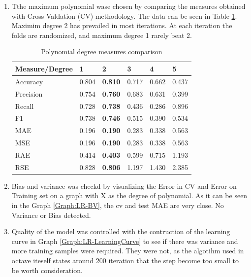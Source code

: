 \documentclass{article}
\begin{document}
\begin{enumerate}  
\item Tthe maximum polynomial wase chosen by comparing the measures obtained with Cross Valdation (CV) methodology. The data can be seen in Table
\ref{tab:LR-Measures}. Maximim degree 2 has prevailed in most iterations. At each iteration the folds are randomized, and maximum degree 1 rarely beat 2.

\begin{table}[]
\centering
\caption{Polynomial degree measures comparison}
\label{tab:LR-Measures}
\begin{tabular}{|l|l|l|l|l|l|}
\hline
Measure/Degree  & 1     & \textbf{2}     & 3     & 4     & 5     \\ \hline
Accuracy  		& 0.804 & \textbf{0.810} & 0.717 & 0.662 & 0.437 \\ \hline
Precision		& 0.754 & \textbf{0.760} & 0.683 & 0.631 & 0.399 \\ \hline
Recall    		& 0.728 & \textbf{0.738} & 0.436 & 0.286 & 0.896 \\ \hline
F1        		& 0.738 & \textbf{0.746} & 0.515 & 0.390 & 0.534 \\ \hline
MAE       		& 0.196 & \textbf{0.190} & 0.283 & 0.338 & 0.563 \\ \hline
MSE       		& 0.196 & \textbf{0.190} & 0.283 & 0.338 & 0.563 \\ \hline
RAE       		& 0.414 & \textbf{0.403} & 0.599 & 0.715 & 1.193 \\ \hline
RSE       		& 0.828 & \textbf{0.806} & 1.197 & 1.430 & 2.385 \\ \hline
\end{tabular}
\end{table}

\item Bias and variance was checkd by visualizing the Error in CV and Error on Training set on a graph with X as the degree of polynomial. As it can be seen in the Graph \ref{Graph:LR-BV}, the cv and test MAE are very close. No Variance or Bias detected. 


\item Quality of the model was controlled with the contruction of the learning curve in Graph \ref{Graph:LR-LearningCurve} to see if there was variance and more training samples were required. They were not, as the algotihm used in octave iteself states around 200 iteration that the step become too small to be worth consideration.
\end{enumerate}
\end{document}
